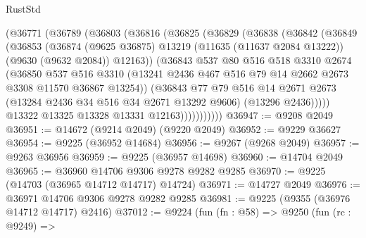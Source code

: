 \begin{lexlean}{RustStd}
\begin{coremodule}
            (@36771
              (@36789
                (@36803
                  (@36816
                    (@36825
                      (@36829
                        (@36838
                          (@36842
                            (@36849
                              (@36853
                                (@36874
                                  (@9625 @36875)
                                  @13219
                                  (@11635 (@11637 @2084 @13222))
                                  (@9630 (@9632 @2084))
                                  @12163))
                              (@36843
                                @537
                                @80
                                @516
                                @518
                                @3310
                                @2674
                                (@36850
                                  @537
                                  @516
                                  @3310
                                  (@13241
                                    @2436
                                    @467
                                    @516
                                    @79
                                    @14
                                    @2662
                                    @2673
                                    @3308
                                    @11570
                                    @36867
                                    @13254))
                                (@36843
                                  @77
                                  @79
                                  @516
                                  @14
                                  @2671
                                  @2673
                                  (@13284 @2436 @34 @516 @34 @2671 @13292 @9606)
                                  (@13296 @2436)))))
                          @13322
                          @13325
                          @13328
                          @13331
                          @12163)))))))))))
@36947 := @9208 @2049
@36951 := @14672 (@9214 @2049) (@9220 @2049)
@36952 := @9229 @36627
@36954 := @9225 (@36952 @14684)
@36956 := @9267 (@9268 @2049)
@36957 := @9263 @36956
@36959 := @9225 (@36957 @14698)
@36960 := @14704 @2049
@36965 := @36960 @14706 @9306 @9278 @9282 @9285
@36970 := @9225 (@14703 (@36965 @14712 @14717) @14724)
@36971 := @14727 @2049
@36976 := @36971 @14706 @9306 @9278 @9282 @9285
@36981 := @9225 (@9355 (@36976 @14712 @14717) @2416)
@37012 := @9224
    (fun (fn : @58) =>
    @9250
      (fun (rc : @9249) =>

\end{coremodule}
\end{lexlean}

